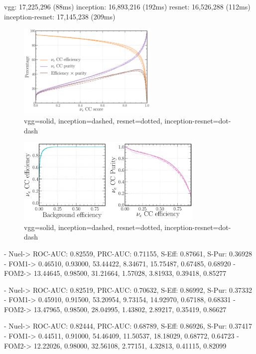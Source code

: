 vgg: 17,225,296 (88ms)
inception: 16,893,216 (192ms)
resnet: 16,526,288 (112ms)
inception-resnet: 17,145,238 (209ms)

\begin{figure} %
    \includegraphics[width=0.6\textwidth]{diagrams/6-cvn/chipsnet/arch_nuel_eff_curves.pdf}
    \caption[arch nuel eff curves short]
    {vgg=solid, inception=dashed, resnet=dotted, inception-resnet=dot-dash}
    \label{fig:arch_nuel_eff_curves}
\end{figure}

\begin{figure} %
    \includegraphics[width=0.8\textwidth]{diagrams/6-cvn/chipsnet/arch_nuel_comp_curves.pdf}
    \caption[arch nuel comp curves short]
    {vgg=solid, inception=dashed, resnet=dotted, inception-resnet=dot-dash}
    \label{fig:arch_nuel_comp_curves}
\end{figure}

- Nuel-> ROC-AUC: 0.82559, PRC-AUC: 0.71155, S-Eff: 0.87661, S-Pur: 0.36928
- FOM1-> 0.46510, 0.93000, 53.44422, 8.34671, 15.75487, 0.67485, 0.68920
- FOM2-> 13.44645, 0.98500, 31.21664, 1.57028, 3.81933, 0.39418, 0.85277

- Nuel-> ROC-AUC: 0.82519, PRC-AUC: 0.70632, S-Eff: 0.86992, S-Pur: 0.37332
- FOM1-> 0.45910, 0.91500, 53.20954, 9.73154, 14.92970, 0.67188, 0.68331
- FOM2-> 13.47965, 0.98500, 28.04995, 1.43802, 2.89217, 0.35419, 0.86627

- Nuel-> ROC-AUC: 0.82444, PRC-AUC: 0.68789, S-Eff: 0.86926, S-Pur: 0.37417
- FOM1-> 0.44511, 0.91000, 54.46409, 11.50537, 18.18029, 0.68772, 0.64723
- FOM2-> 12.22026, 0.98000, 32.56108, 2.77151, 4.32813, 0.41115, 0.82099

